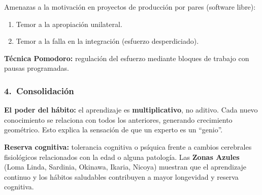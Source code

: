 \documentclass[11pt, a4paper]{article}
\begin{document}
Amenazas a la motivaci\'on en proyectos de producci\'on por pares (software libre):
\begin{enumerate}[nosep]
    \item Temor a la apropiaci\'on unilateral.
    \item Temor a la falla en la integraci\'on (esfuerzo desperdiciado).
\end{enumerate}

\textbf{T\'ecnica Pomodoro:} regulaci\'on del esfuerzo mediante bloques de trabajo con pausas programadas.

\subsubsection{4.\ Consolidaci\'on}

\textbf{El poder del h\'abito:} el aprendizaje es \textbf{multiplicativo}, no aditivo. Cada nuevo conocimiento se relaciona con todos los anteriores, generando crecimiento geom\'etrico. Esto explica la sensaci\'on de que un experto es un ``genio''.

\textbf{Reserva cognitiva:} tolerancia cognitiva o ps\'iquica frente a cambios cerebrales fisiol\'ogicos relacionados con la edad o alguna patolog\'ia. Las \textbf{Zonas Azules} (Loma Linda, Sardinia, Okinawa, Ikaria, Nicoya) muestran que el aprendizaje continuo y los h\'abitos saludables contribuyen a mayor longevidad y reserva cognitiva.
\end{document}
